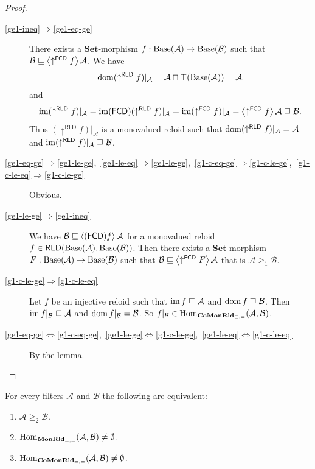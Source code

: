 \begin{proof}
~
\begin{description}
\item [{\ref{ge1-ineq}$\Rightarrow$\ref{ge1-eq-ge}}] There exists a
$\mathbf{Set}$-morphism $f:\operatorname{Base}(\mathcal{A})\rightarrow\operatorname{Base}(\mathcal{B})$
such that $\mathcal{B}\sqsubseteq\left\langle \uparrow^{\mathsf{FCD}}f\right\rangle\mathcal{A}$.
We have
\[
\operatorname{dom}(\uparrow^{\mathsf{RLD}}f)|_{\mathcal{A}}=\mathcal{A}\sqcap\top(\operatorname{Base}(\mathcal{A}))=\mathcal{A}
\]
and
\[
\operatorname{im}(\uparrow^{\mathsf{RLD}}f)|_{\mathcal{A}}=\operatorname{im}(\mathsf{FCD})(\uparrow^{\mathsf{RLD}}f)|_{\mathcal{A}}=\operatorname{im}(\uparrow^{\mathsf{FCD}}f)|_{\mathcal{A}}=\left\langle \uparrow^{\mathsf{FCD}}f\right\rangle\mathcal{A}\sqsupseteq\mathcal{B}.
\]
Thus $(\uparrow^{\mathsf{RLD}}f)|_{\mathcal{A}}$ is a monovalued
reloid such that $\operatorname{dom}(\uparrow^{\mathsf{RLD}}f)|_{\mathcal{A}}=\mathcal{A}$
and $\operatorname{im}(\uparrow^{\mathsf{RLD}}f)|_{\mathcal{A}}\sqsupseteq\mathcal{B}$.
\item [{\ref{ge1-eq-ge}$\Rightarrow$\ref{ge1-le-ge},~\ref{ge1-le-eq}$\Rightarrow$\ref{ge1-le-ge},~\ref{g1-c-eq-ge}$\Rightarrow$\ref{g1-c-le-ge},~\ref{g1-c-le-eq}$\Rightarrow$\ref{g1-c-le-ge}}] Obvious.
\item [{\ref{ge1-le-ge}$\Rightarrow$\ref{ge1-ineq}}] We have $\mathcal{B}\sqsubseteq\left\langle (\mathsf{FCD}) f\right\rangle\mathcal{A}$
for a monovalued reloid $f\in\mathsf{RLD}(\operatorname{Base}(\mathcal{A}),\operatorname{Base}(\mathcal{B}))$.
Then there exists a $\mathbf{Set}$-morphism $F:\operatorname{Base}(\mathcal{A})\rightarrow\operatorname{Base}(\mathcal{B})$
such that $\mathcal{B}\sqsubseteq\left\langle \uparrow^{\mathsf{FCD}}F\right\rangle\mathcal{A}$
that is $\mathcal{A}\ge_{1}\mathcal{B}$.
\item [{\ref{g1-c-le-ge}$\Rightarrow$\ref{g1-c-le-eq}}] Let $f$ be an injective reloid such that
$\operatorname{im} f\sqsubseteq\mathcal{A}$ and $\operatorname{dom} f\sqsupseteq\mathcal{B}$. Then
$\operatorname{im} f|_{\mathcal{B}}\sqsubseteq\mathcal{A}$ and $\operatorname{dom} f|_{\mathcal{B}}=\mathcal{B}$.
So $f|_{\mathcal{B}}\in\operatorname{Hom}_{\mathbf{CoMonRld}_{\sqsubseteq,=}}(\mathcal{A},\mathcal{B})$.
\item [{\ref{ge1-eq-ge}$\Leftrightarrow$\ref{g1-c-eq-ge},~\ref{ge1-le-ge}$\Leftrightarrow$\ref{g1-c-le-ge},~\ref{ge1-le-eq}$\Leftrightarrow$\ref{g1-c-le-eq}}] By
the lemma.
\end{description}
\end{proof}
\begin{thm}
For every filters $\mathcal{A}$ and $\mathcal{B}$ the following
are equivalent:
\begin{enumerate}
\item \label{ge2-in}$\mathcal{A}\ge_{2}\mathcal{B}$.
\item \label{ge2-mon}$\operatorname{Hom}_{\mathbf{MonRld}_{=,=}}(\mathcal{A},\mathcal{B})\ne\emptyset$.
\item \label{ge2-comon}$\operatorname{Hom}_{\mathbf{CoMonRld}_{=,=}}(\mathcal{A},\mathcal{B})\ne\emptyset$.
\end{enumerate}
\end{thm}

